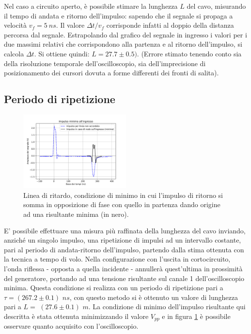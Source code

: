 \documentclass[journal]{IEEEtran}
\begin{document}
Nel caso a circuito aperto, è possibile stimare la lunghezza $L$ del cavo, misurando il tempo di andata e ritorno dell'impulso: sapendo che il segnale si propaga a velocità $v_f = 5 \ ns$. Il valore $\Delta t / {v_f}$ corrisponde infatti al doppio della distanza percorsa dal segnale. 
Estrapolando dal grafico del segnale in ingresso i valori per i due massimi relativi che corrispondono alla partenza e al ritorno dell'impulso, si calcola $\Delta t$. Si ottiene quindi: 
$L = 27.7 \pm 0.5)$. (Errore stimato tenendo conto sia della risoluzione temporale dell'oscilloscopio, sia dell'imprecisione di posizionamento dei cursori dovuta a forme differenti dei fronti di salita).


\subsection{\textbf{Periodo di ripetizione}}

\begin{figure}[H]%
\begin{center}
\includegraphics[width=0.5\textwidth]{analysis/output/Delay_line_repetition.pdf}
\caption{Linea di ritardo, condizione di minimo in cui l'impulso di ritorno si somma in opposizione di fase con quello in partenza dando origine ad una risultante minima (in nero).}
\label{fig: ripetizione di impulsi}
\end{center}
\end{figure}


E' possibile effettuare una misura più raffinata della lunghezza del cavo inviando, anziché un singolo impulso, una ripetizione di impulsi ad un intervallo costante, pari al periodo di andata-ritorno dell'impulso, partendo dalla stima ottenuta con la tecnica a tempo di volo. Nella configurazione con l'uscita in cortocircuito, l'onda riflessa - opposta a quella incidente - annullerà quest'ultima in prossimità del generatore, portando ad una tensione risultante sul canale 1 dell'oscilloscopio minima. Questa condizione si realizza con un periodo di ripetizione pari a $\tau = (267.2 \pm 0.1)$ $ns$, con questo metodo si è ottenuto un valore di lunghezza pari a $ L = $ $(27.6 \pm 0.1)$ $m $. La condizione di minimo dell'impulso risultante qui descritta è stata ottenuta minimizzando il valore $V_{pp}$ e in figura \ref{fig: ripetizione di impulsi} è possibile osservare quanto acquisito con l'oscilloscopio.
\end{document}
